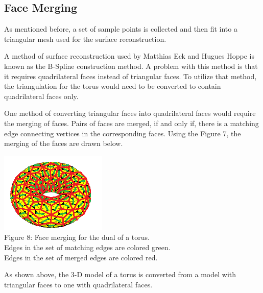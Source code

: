 \documentclass[12pt]{article}
\begin{document}
\begin{flushleft}
\section*{Face Merging}
As mentioned before, a set of sample points is collected and then fit into a triangular mesh used for the surface reconstruction.

\medskip
A method of surface reconstruction used by Matthias Eck and Hugues Hoppe is known as the B-Spline construction method. A problem with this method is that it requires quadrilateral faces instead of triangular faces. To utilize that method, the triangulation for the torus would need to be converted to contain quadrilateral faces only.

\medskip
One method of converting triangular faces into quadrilateral faces would require the merging of faces. Pairs of faces are merged, if and only if, there is a matching edge connecting vertices in the corresponding faces. Using the Figure 7, the merging of the faces are drawn below.

\begin{center}
\includegraphics[scale=1.7]{images/torusmerging.png}\\
Figure 8: Face merging for the dual of a torus.\\
Edges in the set of matching edges are colored green.\\
Edges in the set of merged edges are colored red.
\end{center}

As shown above, the 3-D model of a torus is converted from a model with triangular faces to one with quadrilateral faces.

\end{flushleft}
\end{document}
